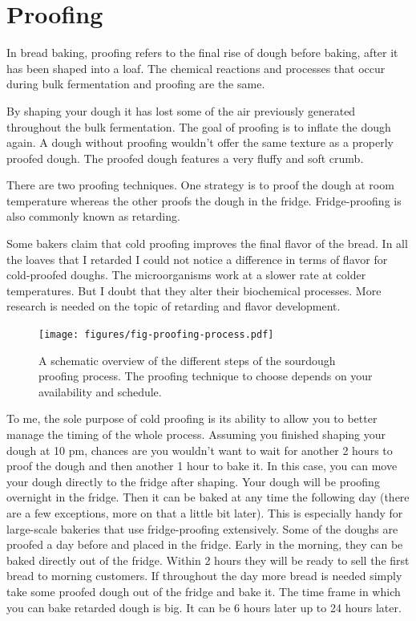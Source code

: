\section{Proofing}

In bread baking, proofing refers to the final rise of dough before baking,
after it has been shaped into a loaf. The chemical reactions and processes
that occur during bulk fermentation and proofing are the same.

By shaping your dough it has lost some of the air previously generated
throughout the bulk fermentation. The goal of proofing is to inflate
the dough again. A dough without proofing wouldn't offer the same texture
as a properly proofed dough. The proofed dough features a very fluffy
and soft crumb.

There are two proofing techniques. One strategy is to proof the dough
at room temperature whereas the other proofs the dough in the fridge.
Fridge-proofing is also commonly known as retarding.

Some bakers claim that cold proofing improves the final flavor of the bread.
In all the loaves that I retarded I could not notice a difference
in terms of flavor for cold-proofed doughs. The microorganisms work
at a slower rate at colder temperatures. But I doubt that they alter
their biochemical processes. More research is needed on the topic
of retarding and flavor development.

\begin{figure}[!htb]
  \texttt{[image: figures/fig-proofing-process.pdf]}
  \caption{A schematic overview of the different steps of the sourdough proofing process. The proofing technique to choose
  depends on your availability and schedule.}
  \label{fig:proofing-process}
\end{figure}

To me, the sole purpose of cold proofing is its ability to allow you
to better manage the timing of the whole process. Assuming you finished shaping
your dough at 10 pm, chances are you wouldn't want to wait for another
2 hours to proof the dough and then another 1 hour to bake it. In this case,
you can move your dough directly to the fridge after shaping. Your
dough will be proofing overnight in the fridge. Then it can be baked at any time
the following day (there are a few exceptions, more on that a little bit later).
This is especially handy for large-scale bakeries that use fridge-proofing
extensively. Some of the doughs are proofed a day before and placed in the fridge.
Early in the morning, they can be baked directly out of the fridge. Within 2
hours they will be ready to sell the first bread to morning customers. If
throughout the day more bread is needed simply take some proofed dough out
of the fridge and bake it. The time frame in which you can bake retarded
dough is big. It can be 6 hours later up to 24 hours later.

